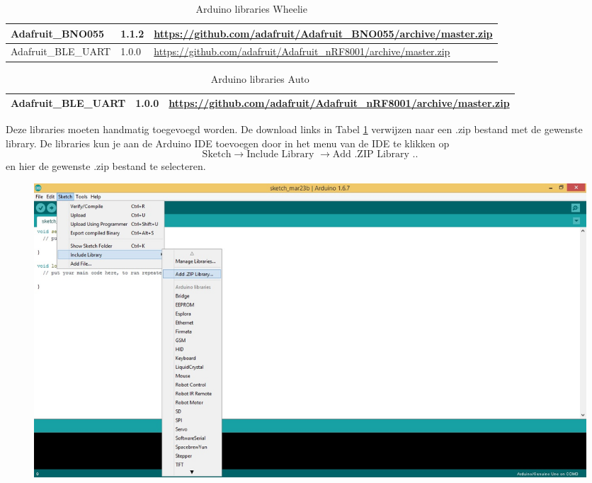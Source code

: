 \documentclass[12pt,a4paper]{article}
\begin{document}
\begin{table}[H]
	\begin{tabularx}{\textwidth}{|l|l|X|}
		\hline Adafruit\_BNO055 & 1.1.2 & \url{https://github.com/adafruit/Adafruit_BNO055/archive/master.zip} \\ 
		\hline Adafruit\_BLE\_UART & 1.0.0 & \url{https://github.com/adafruit/Adafruit_nRF8001/archive/master.zip }\\ 
		\hline		
	\end{tabularx} 
	\caption{Arduino libraries Wheelie}
	\label{tbl:Download_link}
\end{table}
\begin{table}[H]
	\begin{tabularx}{\textwidth}{|l|l|X|}
		\hline Adafruit\_BLE\_UART & 1.0.0 & \url{https://github.com/adafruit/Adafruit_nRF8001/archive/master.zip }\\ 
		\hline		
	\end{tabularx} 
	\caption{Arduino libraries Auto}
	\label{tbl:Download_link auto}
\end{table}

Deze libraries moeten handmatig toegevoegd worden. De download links in Tabel \ref{tbl:Download_link} verwijzen naar een .zip bestand met de gewenste library. De libraries kun je aan de Arduino IDE toevoegen door in het menu van de IDE te klikken op $$ \text{Sketch} \rightarrow \text{Include Library }\rightarrow \text{Add .ZIP Library ..}$$ en hier de gewenste .zip bestand te selecteren.
\begin{figure}[h]
\centering
\includegraphics[width=0.7\linewidth]{Add_ZIP}
\label{fig:Add_ZIP}
\end{figure}
\end{document}

